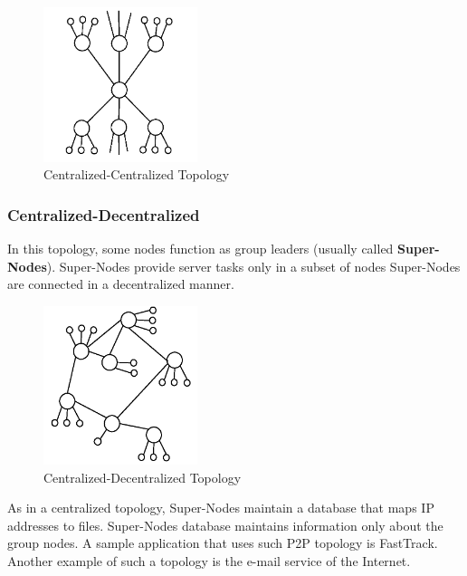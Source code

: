\begin{figure}
  \centering
  \includegraphics[width=0.4\textwidth]{src/img/p2p-systems/centralized-centralized}
  \caption{Centralized-Centralized Topology}
  \label{fig:p2p-systems:centralized-centralized}
\end{figure}

\subsubsection{Centralized-Decentralized}

In this topology, some nodes function as group leaders (usually called
\textbf{Super-Nodes}). Super-Nodes provide server tasks only in a subset of
nodes  Super-Nodes are connected in a decentralized manner.

\begin{figure}
  \centering
  \includegraphics[width=0.4\textwidth]{src/img/p2p-systems/centralized-decentralized}
  \caption{Centralized-Decentralized Topology}
  \label{fig:p2p-systems:centralized-decentralized}
\end{figure}

As in a centralized topology, Super-Nodes maintain a database that maps IP
addresses to files. Super-Nodes database maintains information only about
the group nodes. A sample application that uses such P2P topology is
FastTrack. Another example of such a topology is the e-mail service of the
Internet.


